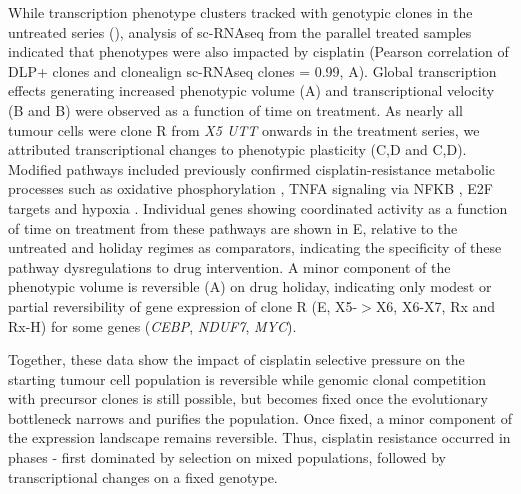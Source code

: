 While transcription phenotype clusters tracked with genotypic clones in the untreated series (), analysis of sc-RNAseq from the parallel treated samples indicated that phenotypes were also impacted by cisplatin (Pearson correlation of DLP+ clones and clonealign sc-RNAseq clones = 0.99, A). Global transcription effects generating increased phenotypic volume\cite{Azizi2018-eb} (A) and transcriptional velocity\cite{La_Manno2018-az} (B and B) were observed as a function of time on treatment.  As nearly all tumour cells were clone R from \textit{X5 UTT} onwards in the treatment series, we attributed transcriptional changes to phenotypic plasticity (C,D and C,D). Modified pathways included previously confirmed cisplatin-resistance metabolic processes such as oxidative phosphorylation \cite{lee2017myc}, TNFA signaling via NFKB \cite{lagunas2008nuclear,ito2015down,ryan2019targeting}, E2F targets \cite{zheng2020upregulation} and hypoxia \cite{lee2012hypoxia,mcevoy2015identifying,deben2018hypoxia,li2019erk}. Individual genes showing coordinated activity as a function of time on treatment from these pathways are shown in E, relative to the untreated and holiday regimes as comparators, indicating the specificity of these pathway dysregulations to drug intervention. A minor component of the phenotypic volume is reversible (A) on drug holiday, indicating only modest or partial reversibility of gene expression of clone R (E, X5-$>$X6, X6-X7, Rx and Rx-H) for some genes (\textit{CEBP}, \textit{NDUF7}, \textit{MYC}).

Together, these data show the impact of cisplatin selective pressure on the starting tumour cell population is reversible while genomic clonal competition with precursor clones is still possible, but becomes fixed once the evolutionary bottleneck narrows and purifies the population. Once fixed, a minor component of the expression landscape remains reversible. Thus, cisplatin resistance occurred in phases - first dominated by selection on mixed populations, followed by transcriptional changes on a fixed genotype.







